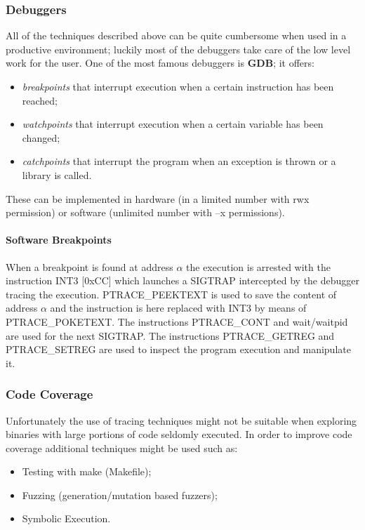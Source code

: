 \subsubsection{Debuggers}
All of the techniques described above can be quite cumbersome when used in a productive environment; luckily most of the
debuggers take care of the low level work for the user. One of the most famous debuggers is \textbf{GDB}; it offers:
\begin{itemize}
    \item \textit{breakpoints} that interrupt execution when a certain instruction has been reached;
    \item \textit{watchpoints} that interrupt execution when a certain variable has been changed;
    \item \textit{catchpoints} that interrupt the program when an exception is thrown or a library is called.
\end{itemize}
These can be implemented in hardware (in a limited number with {\ttfamily rwx} permission) or software (unlimited number
with {\ttfamily --x} permissions).

\paragraph{Software Breakpoints}
When a breakpoint is found at address $\alpha$ the execution is arrested with the instruction {\ttfamily INT3 [0xCC]}
which launches a {\ttfamily SIGTRAP} intercepted by the debugger tracing the execution. {\ttfamily PTRACE\_PEEKTEXT} is
used to save the content of address $\alpha$ and the instruction is here replaced with {\ttfamily INT3} by means of
{\ttfamily PTRACE\_POKETEXT}. The instructions {\ttfamily PTRACE\_CONT} and {\ttfamily wait/waitpid} are used for the
next {\ttfamily SIGTRAP}. The instructions {\ttfamily PTRACE\_GETREG} and {\ttfamily PTRACE\_SETREG} are used to
inspect the program execution and manipulate it.

\subsubsection{Code Coverage}
Unfortunately the use of tracing techniques might not be suitable when exploring binaries with large portions of code
seldomly executed.
In order to improve code coverage additional techniques might be used such as:
\begin{itemize}
    \item Testing with make (Makefile);
    \item Fuzzing (generation/mutation based fuzzers);
    \item Symbolic Execution.
\end{itemize}


